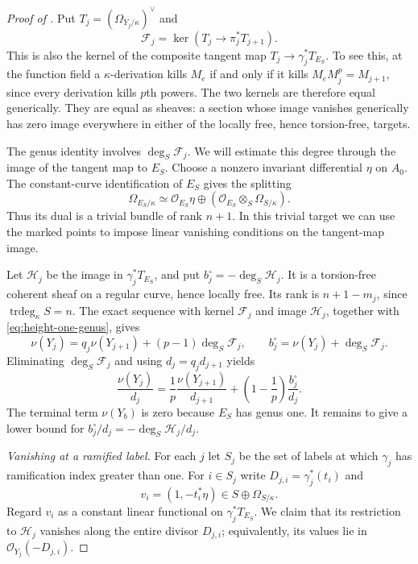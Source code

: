 \begin{proof}[Proof of ]
Put $T_j=(\Omega_{Y_j/\kappa})^\vee$ and
\[
 \mathcal F_j=\ker(T_j\longrightarrow\pi_j^*T_{j+1}).
\]
This is also the kernel of the composite tangent map
$T_j\to\gamma_j^*T_{E_S}$.  To see this, at the function field a
$\kappa$-derivation kills $M_e$ if and only if it kills
$M_eM_j^p=M_{j+1}$, since every derivation kills $p$th powers.
The two kernels are therefore equal generically.  They are equal as
sheaves: a section whose image vanishes generically has zero image
everywhere in either of the locally free, hence torsion-free, targets.

The genus identity involves $\deg_S\mathcal F_j$. We will estimate
this degree through the image of the tangent map to $E_S$.
Choose a nonzero invariant differential $\eta$ on $A_0$.
The constant-curve identification of $E_S$ gives the splitting
\[
 \Omega_{E_S/\kappa}
   \simeq\mathcal O_{E_S}\eta
      \oplus(\mathcal O_{E_S}\otimes_S\Omega_{S/\kappa}).
\]
Thus its dual is a trivial bundle of rank $n+1$. In this trivial
target we can use the marked points to impose linear vanishing
conditions on the tangent-map image.

Let $\mathcal H_j$ be the image in $\gamma_j^*T_{E_S}$, and put
$b_j^\circ=-\deg_S\mathcal H_j$.
It is a torsion-free coherent sheaf on a regular curve, hence locally
free.  Its rank is $n+1-m_j$, since
$\operatorname{trdeg}_\kappa S=n$.
The exact sequence with kernel $\mathcal F_j$ and image $\mathcal H_j$,
together with \eqref{eq:height-one-genus}, gives
\[
 \nu(Y_j)=q_j\nu(Y_{j+1})+(p-1)\deg_S\mathcal F_j,
 \qquad
 b_j^\circ=\nu(Y_j)+\deg_S\mathcal F_j.
\]
Eliminating $\deg_S\mathcal F_j$ and using $d_j=q_jd_{j+1}$ yields
\begin{equation}
 \frac{\nu(Y_j)}{d_j}
  =\frac1p\frac{\nu(Y_{j+1})}{d_{j+1}}
     +\left(1-\frac1p\right)\frac{b_j^\circ}{d_j}.
 \label{eq:genus-recurrence}
\end{equation}
The terminal term $\nu(Y_b)$ is zero because $E_S$ has genus one.
It remains to give a lower bound for
$b_j^\circ/d_j=-\deg_S\mathcal H_j/d_j$.

\textit{Vanishing at a ramified label.}
For each $j$ let $S_j$ be the set of labels at which $\gamma_j$ has
ramification index greater than one.  For $i\in S_j$ write
$D_{j,i}=\gamma_j^*(t_i)$ and
\[
 v_i=(1,-t_i^*\eta)\in S\oplus\Omega_{S/\kappa}.
\]
Regard $v_i$ as a constant linear functional on
$\gamma_j^*T_{E_S}$. We claim that its restriction to $\mathcal H_j$
vanishes along the entire divisor $D_{j,i}$; equivalently, its values
lie in $\mathcal O_{Y_j}(-D_{j,i})$.


\end{proof}
